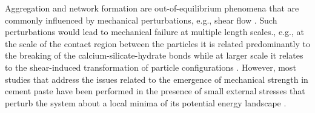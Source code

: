 \documentclass[final,5p,twocolumn]{elsarticle}
\begin{document}
	Aggregation and network formation are   out-of-equilibrium phenomena that are commonly influenced by mechanical perturbations, e.g., shear flow \cite{lapasin_1979, roussel_origins_2012, roussel_rheology_2007}. Such  perturbations  would lead to mechanical failure \cite{sollich_rheology_1997} at multiple length scales., e.g., at the scale of the contact region between the particles it is related predominantly to the breaking of the calcium-silicate-hydrate bonds while at larger scale it relates to the shear-induced transformation of  particle configurations \cite{roussel_origins_2012}. However, most studies that address the issues related to the emergence of  mechanical strength in cement paste have been performed in the presence of small external stresses that perturb the system about a local minima of its potential energy landscape  \cite{roussel_understanding_2012, roussel_rheology_2007, bellotto_2013, nachbaur_2001}.
	
\end{document}
